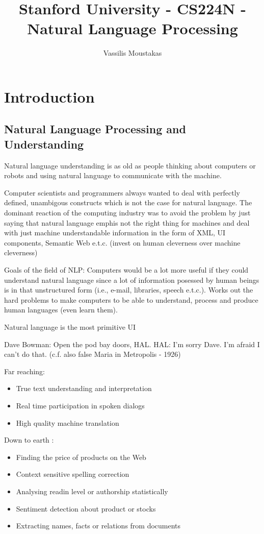 \documentclass[a4paper,10pt]{report}
\title{Stanford University - CS224N - Natural Language Processing}
\author{Vassilis Moustakas}
\begin{document}
\maketitle


\chapter*{Introduction}

\section*{Natural Language Processing and Understanding}
Natural language understanding is as old as people thinking about computers or robots and using natural language to communicate with the machine.

Computer scientists and programmers always wanted to deal with perfectly defined, unambigous constructs which is not the case for natural language. The dominant reaction of the computing industry was to avoid the problem by just saying that natural language emph{is not the right thing for machines} and deal with just machine understandable information in the form of XML, UI components, Semantic Web e.t.c. (invest on human cleverness over machine cleverness)

Goals of the field of NLP: Computers would be a lot more useful if they could understand natural language since a lot of information posessed by human beings is in that unstructured form  (i.e., e-mail, libraries, speech e.t.c.). Works out the hard problems to make computers to be able to understand, process and produce human languages (even learn them).

Natural language is the most primitive UI

Dave Bowman: Open the pod bay doors, HAL.
HAL: I'm sorry Dave. I'm afraid I can't do that.
(c.f. also false Maria in Metropolis - 1926)

Far reaching:
\begin{itemize}
 \item True text understanding and interpretation
 \item Real time participation in spoken dialogs
 \item High quality machine translation
\end{itemize}

Down to earth :
\begin{itemize}
 \item Finding the price of products on the Web
 \item Context sensitive spelling correction
 \item Analysing readin level or authorship statistically
 \item Sentiment detection about product or stocks
 \item Extracting names, facts or relations from documents
\end{itemize}
\end{document}
